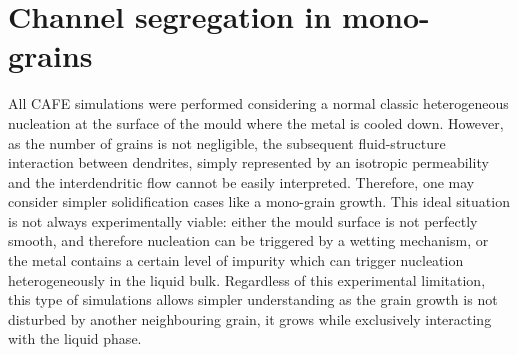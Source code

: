 \chapter{Channel segregation in mono-grains}


All CAFE simulations were performed considering a normal classic heterogeneous nucleation at 
the surface of the mould where the metal is cooled down. However, as the number of grains is
not negligible, the subsequent fluid-structure interaction between dendrites, simply represented by an isotropic permeability 
and the interdendritic flow cannot be easily interpreted. Therefore, one may consider simpler solidification cases 
like a mono-grain growth. This ideal situation is not always experimentally viable: either the mould surface is not 
perfectly smooth, and therefore nucleation can be triggered by a wetting mechanism, or the metal contains a certain level of impurity
which can trigger nucleation heterogeneously in the liquid bulk. 
Regardless of this experimental limitation, this type of simulations allows simpler understanding as the grain growth is not 
disturbed by another neighbouring grain, it grows while exclusively interacting with the liquid phase.

